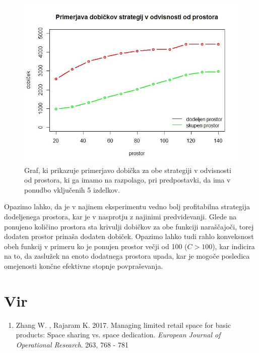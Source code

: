 \documentclass[a4paper]{article}
\begin{document}
\begin{figure}[ht]
\includegraphics [scale = 0.68]{primerjava-strategij-kolicina-prostora}
\caption{Graf, ki prikazuje primerjavo dobička za obe strategiji v odvisnosti od prostora, ki ga imamo na razpolago, pri predpostavki, da ima v ponudbo vključenih 5 izdelkov.}
\end{figure}

Opazimo lahko, da je v najinem eksperimentu vedno bolj profitabilna strategija dodeljenega prostora, kar je v nasprotju z najinimi predvidevanji. Glede na ponujeno količino prostora sta krivulji dobičkov za obe funkciji naraščajoči, torej dodaten prostor prinaša dodaten dobiček. Opazimo lahko tudi rahlo konveksnost obeh funkcij v primeru ko je ponujen prostor večji od 100 ($C > 100$), kar indicira na to, da zaslužek na enoto dodatnega prostora upada, kar je mogoče posledica omejenosti končne efektivne stopnje povpraševanja.

\section{Vir}

\begin{enumerate}
\item Zhang W. , Rajaram K. 2017. Managing limited retail space for basic products: Space sharing vs. space dedication. \textit{European Journal of Operational Research}. 263, 768 - 781
\end{enumerate}
\end{document}
